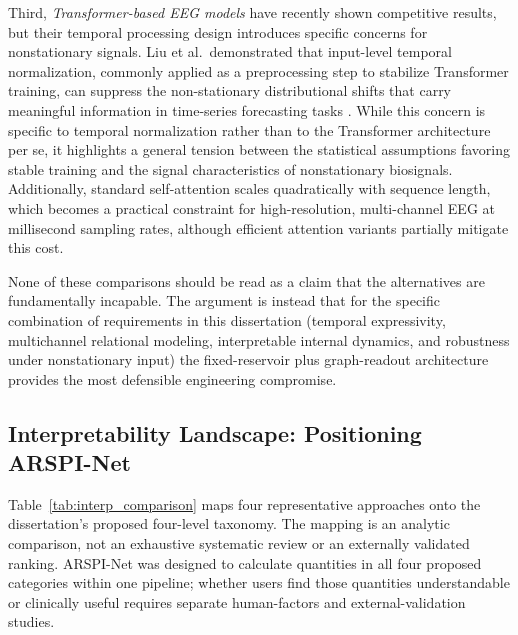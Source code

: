 Third, \emph{Transformer-based EEG models} have recently shown competitive results, but their temporal processing design introduces specific concerns for nonstationary signals. Liu et al.\ demonstrated that input-level temporal normalization, commonly applied as a preprocessing step to stabilize Transformer training, can suppress the non-stationary distributional shifts that carry meaningful information in time-series forecasting tasks \cite{liu_nonstationary_2022}. While this concern is specific to temporal normalization rather than to the Transformer architecture per se, it highlights a general tension between the statistical assumptions favoring stable training and the signal characteristics of nonstationary biosignals. Additionally, standard self-attention scales quadratically with sequence length, which becomes a practical constraint for high-resolution, multi-channel EEG at millisecond sampling rates, although efficient attention variants partially mitigate this cost.

None of these comparisons should be read as a claim that the alternatives are fundamentally incapable. The argument is instead that for the specific combination of requirements in this dissertation (temporal expressivity, multichannel relational modeling, interpretable internal dynamics, and robustness under nonstationary input) the fixed-reservoir plus graph-readout architecture provides the most defensible engineering compromise.

\subsection{Interpretability Landscape: Positioning ARSPI-Net}
\label{sec:interp_landscape}

Table~\ref{tab:interp_comparison} maps four representative approaches onto the dissertation's proposed four-level taxonomy. The mapping is an analytic comparison, not an exhaustive systematic review or an externally validated ranking. ARSPI-Net was designed to calculate quantities in all four proposed categories within one pipeline; whether users find those quantities understandable or clinically useful requires separate human-factors and external-validation studies.

